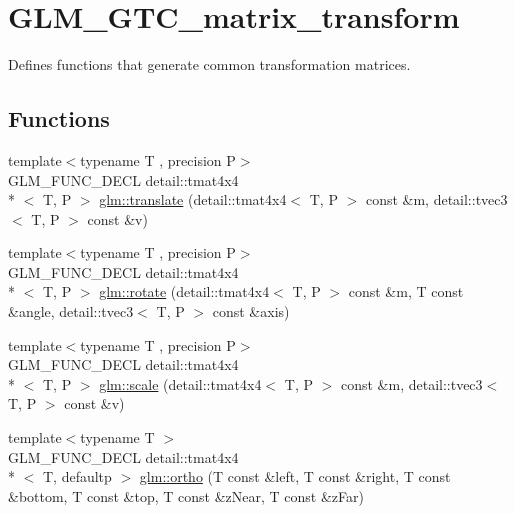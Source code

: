 \hypertarget{group__gtc__matrix__transform}{\section{G\-L\-M\-\_\-\-G\-T\-C\-\_\-matrix\-\_\-transform}
\label{group__gtc__matrix__transform}
}


Defines functions that generate common transformation matrices.  


\subsection*{Functions}
\begin{DoxyCompactItemize}
\item 
{\footnotesize template$<$typename T , precision P$>$ }\\G\-L\-M\-\_\-\-F\-U\-N\-C\-\_\-\-D\-E\-C\-L detail\-::tmat4x4\\*
$<$ T, P $>$ \hyperlink{group__gtc__matrix__transform_ga1501de0fa580dcc491b67e0685bbc7c2}{glm\-::translate} (detail\-::tmat4x4$<$ T, P $>$ const \&m, detail\-::tvec3$<$ T, P $>$ const \&v)
\item 
{\footnotesize template$<$typename T , precision P$>$ }\\G\-L\-M\-\_\-\-F\-U\-N\-C\-\_\-\-D\-E\-C\-L detail\-::tmat4x4\\*
$<$ T, P $>$ \hyperlink{group__gtc__matrix__transform_ga61e65a3bb227c267d1a15113d1056fb1}{glm\-::rotate} (detail\-::tmat4x4$<$ T, P $>$ const \&m, T const \&angle, detail\-::tvec3$<$ T, P $>$ const \&axis)
\item 
{\footnotesize template$<$typename T , precision P$>$ }\\G\-L\-M\-\_\-\-F\-U\-N\-C\-\_\-\-D\-E\-C\-L detail\-::tmat4x4\\*
$<$ T, P $>$ \hyperlink{group__gtc__matrix__transform_gabd40959f269abd16c256a4f59ab03d62}{glm\-::scale} (detail\-::tmat4x4$<$ T, P $>$ const \&m, detail\-::tvec3$<$ T, P $>$ const \&v)
\item 
{\footnotesize template$<$typename T $>$ }\\G\-L\-M\-\_\-\-F\-U\-N\-C\-\_\-\-D\-E\-C\-L detail\-::tmat4x4\\*
$<$ T, defaultp $>$ \hyperlink{group__gtc__matrix__transform_gac393e9262776e4980731c386123e4377}{glm\-::ortho} (T const \&left, T const \&right, T const \&bottom, T const \&top, T const \&z\-Near, T const \&z\-Far)
\item 

\end{DoxyCompactItemize}
